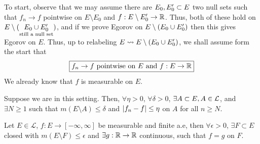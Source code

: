 To start, observe that we may assume there are $E_0, E_0 ^{\prime} \subset E$ two null sets such that $f_n \rightarrow f$ pointwise on $E \setminus E_0$ and $f: E \setminus E_0 ^{\prime} \rightarrow \mathbb{R}$.
Thus, both of these hold on $E \setminus (\underset{\text{still a null set}}{E_0 \cup E_0 ^{\prime}} )$, and if we prove Egorov on $ E \setminus (E_0 \cup E_0 ^{\prime})$ then this gives Egorov on $E$.
Thus, up to relabeling $E \rightsquigarrow E \setminus (E_0 \cup E_0 ^{\prime})$, we shall assume form the start that
\[
    \boxed{f_n \rightarrow f \text{ pointwise on } E \text{ and } f: E \rightarrow \mathbb{R}}
\]
We already know that $f$ is measurable on $E$.

\begin{lemma}
    Suppose we are in this setting.
    Then, $\forall \eta > 0$, $\forall \delta > 0$, $\exists A \subset E, A \in \mathcal{L}$, and $\exists N \geq 1$ such that $m(E \setminus A) \leq \delta$ and $\lvert f_n - f\rvert \leq \eta$ on $A$ for all $n \geq N$.
\end{lemma}

\begin{theorem}
    Let $E \in \mathcal{L}$, $f: E \rightarrow [-\infty, \infty]$ be measurable and finite a.e, then $\forall \epsilon > 0$, $\exists F \subset E$ closed with $m(E \setminus F) \leq \epsilon$ and $\exists g: \mathbb{R} \rightarrow \mathbb{R}$ continuous, such that $f = g$ on $F$.
\end{theorem}